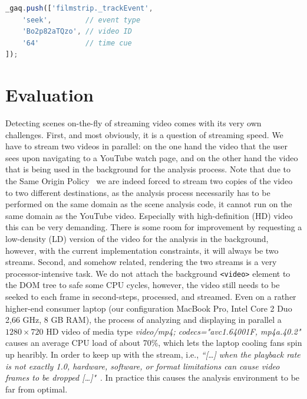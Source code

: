 \documentclass[10pt,twocolumn,letterpaper]{article}
\begin{document}
\begin{lstlisting}[caption=JavaScript hot spot event tracking code snippet. The \texttt{\_gaq} object refers to the Google Analytics event tracking queue., label=code:event, float=t, language=JavaScript]
_gaq.push(['filmstrip._trackEvent', 
    'seek',        // event type
    'Bo2p82aTQzo', // video ID
    '64'           // time cue
]);
\end{lstlisting} 

\section{Evaluation} \label{sec:evaluation}
Detecting scenes on-the-fly of streaming video comes with its very own challenges. First, and most obviously, it is a question of streaming speed. We have to stream two videos in parallel: on the one hand the video that the user sees upon navigating to a YouTube watch page, and on the other hand the video that is being used in the background for the analysis process. Note that due to the Same Origin Policy~\cite{sameoriginpolicy} we are indeed forced to stream two copies of the video to two different destinations, as the analysis process necessarily has to be performed on the same domain as the scene analysis code, it cannot run on the same domain as the YouTube video. Especially with high-definition (HD) video this can be very demanding. There is some room for improvement by requesting a low-density (LD) version of the video for the analysis in the background, however, with the current implementation constraints, it will always be two streams. Second, and somehow related, rendering the two streams is a very processor-intensive task. We do not attach the background \texttt{<video>} element to the DOM tree to safe some CPU cycles, however, the video still needs to be seeked to each frame in second-steps, processed, and streamed. Even on a rather higher-end consumer laptop (our configuration MacBook Pro, Intel Core 2 Duo 2,66 GHz, 8 GB RAM), the process of analyzing and displaying in parallel a $1280 \times 720$ HD video of media type \emph{video/mp4; codecs="avc1.64001F, mp4a.40.2"} causes an average CPU load of about 70\%, which lets the laptop cooling fans spin up hearibly. In order to keep up with the stream, i.e., \textit{``[\ldots] when the playback rate is not exactly 1.0, hardware, software, or format limitations can cause video frames to be dropped [\ldots]"}~\cite{whatwgvideo}. In practice this causes the analysis environment to be far from optimal.
\end{document}
